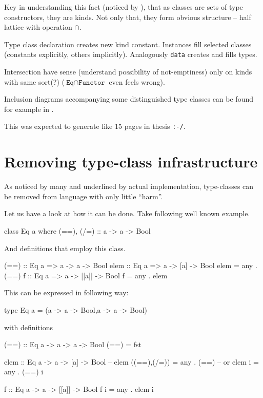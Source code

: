 \documentclass[11pt,oneside,draft]{fithesis2}
\begin{document}
Key in understanding this fact (noticed by \cite{libor}),
that as classes are sets of type constructors, they are kinds.
Not only that, they form obvious structure -- half lattice with operation
\(\cap\).

Type class declaration creates new kind constant.
Instances fill selected classes (constants explicitly, others implicitly).
Analogously \texttt{data} creates and fills types.

Intersection have sense (understand possibility of not-emptiness) only on
kinds with same sort(?) (\(\texttt{Eq} \cap \texttt{Functor}\) even feels wrong).

Inclusion diagrams accompanying some distinguished type classes can be found for
example in \cite{typeclassopedia}.

This was expected to generate like 15 pages in thesis \verb~:-/~.

\section{Removing type-class infrastructure}

As noticed by many and underlined by actual implementation, type-classes can be removed
from language with only little ``harm''.

Let us have a look at how it can be done. Take following well known example.
\begin{code}
class Eq a where
    (==), (/=) :: a -> a -> Bool
\end{code}
And definitions that employ this class.
\begin{code}
(==) :: Eq a => a -> a -> Bool
elem :: Eq a => a -> [a] -> Bool
elem = any . (==)
f :: Eq a => a -> [[a]] -> Bool
f = any . elem
\end{code}

This can be expressed in following way:
\begin{code}
type Eq a = (a -> a -> Bool,a -> a -> Bool)
\end{code}
with definitions
\begin{code}
(==) :: Eq a -> a -> a -> Bool
(==) = fst

elem :: Eq a -> a -> [a] -> Bool
-- elem ((==),(/=)) = any . (==)
-- or
elem i = any . (==) i

f :: Eq a -> a -> [[a]] -> Bool
f i = any . elem i
\end{code}
\end{document}

